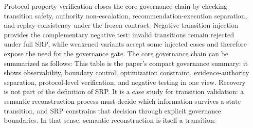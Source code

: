 {}Protocol property verification closes the core governance chain by checking transition safety, authority non-escalation, recommendation-execution separation, and replay consistency under the frozen contract. Negative transition injection provides the complementary negative test: invalid transitions remain rejected under full SRP, while weakened variants accept some injected cases and therefore expose the need for the governance gate.\markdownRendererParagraphSeparator
{}The core governance chain can be summarized as follows:\markdownRendererInterblockSeparator
{}\markdownRendererInterblockSeparator
{}This table is the paper's compact governance summary: it shows observability, boundary control, optimization constraint, evidence-authority separation, protocol-level verification, and negative testing in one view.\markdownRendererInterblockSeparator
{}
\markdownRendererSectionEnd \markdownRendererSectionBegin
{}\markdownRendererInterblockSeparator
{}\markdownRendererSectionBegin
{}\markdownRendererInterblockSeparator
{}Recovery is not part of the definition of SRP. It is a case study for transition validation: a semantic reconstruction process must decide which information survives a state transition, and SRP constrains that decision through explicit governance boundaries.\markdownRendererParagraphSeparator
{}In that sense, semantic reconstruction is itself a transition:\markdownRendererInterblockSeparator
{}\markdownRendererInterblockSeparator

